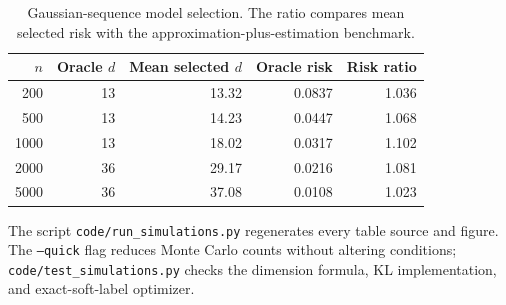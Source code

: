 \begin{table}[ht]
\centering
\caption{Gaussian-sequence model selection. The ratio compares mean selected risk with the approximation-plus-estimation benchmark.}
\label{tab:oracle-full}
\begin{tabular}{rrrrr}
\toprule
\(n\) & Oracle \(d\) & Mean selected \(d\) & Oracle risk & Risk ratio\\
\midrule
200  & 13 & 13.32 & 0.0837 & 1.036\\
500  & 13 & 14.23 & 0.0447 & 1.068\\
1000 & 13 & 18.02 & 0.0317 & 1.102\\
2000 & 36 & 29.17 & 0.0216 & 1.081\\
5000 & 36 & 37.08 & 0.0108 & 1.023\\
\bottomrule
\end{tabular}
\end{table}

The script \texttt{code/run\_simulations.py} regenerates every table source and figure. The \texttt{--quick} flag reduces Monte Carlo counts without altering conditions; \texttt{code/test\_simulations.py} checks the dimension formula, KL implementation, and exact-soft-label optimizer.
